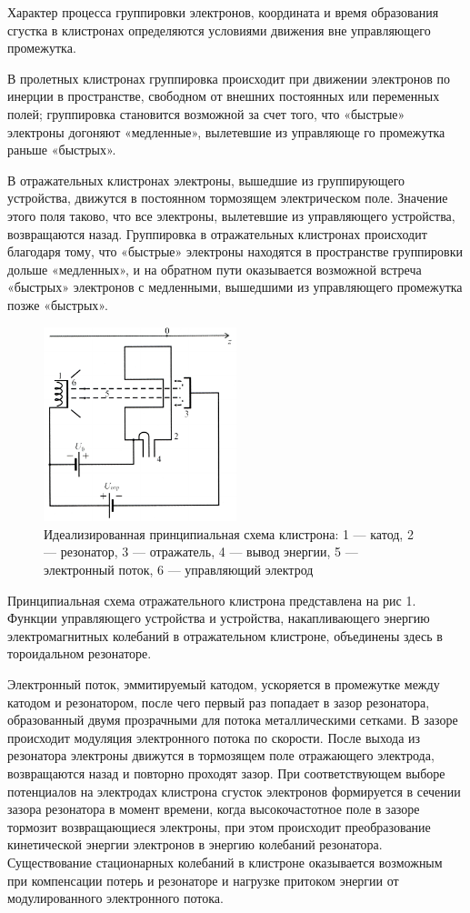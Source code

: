 Характер процесса группировки электронов, координата и время образо­вания сгустка в клистронах определяются условиями движения вне управ­ляющего промежутка.

В пролетных клистронах группировка происходит при движении элек­тронов по инерции в пространстве, свободном от внешних постоянных или
переменных полей; группировка становится возможной за счет того, что
«быстрые» электроны догоняют «медленные», вылетевшие из управляюще­
го промежутка раньше «быстрых».

В отражательных клистронах электроны, вышедшие из группирующего
устройства, движутся в постоянном тормозящем электрическом поле. Зна­чение этого поля таково, что все электроны, вылетевшие из управляющего
устройства, возвращаются назад. Группировка в отражательных клистро­нах происходит благодаря тому, что «быстрые» электроны находятся в про­странстве группировки дольше «медленных», и на обратном пути оказыва­ется возможной встреча «быстрых» электронов с медленными, вышедшими
из управляющего промежутка позже «быстрых».

\begin{figure}[h!]
	\centering
	\includegraphics[width=0.5\textwidth]{fig/fig1}
	\caption{Идеализированная принципиальная схема клистрона: 1 — катод, 2 — резонатор, 3 — отражатель, 4 — вывод энергии, 5 — электронный поток, 6 — управляющий электрод}
	\label{fig:1}
\end{figure}

Принципиальная схема отражательного клистрона представлена на рис 1.
Функции управляющего устройства и устройства, накапливающего энер­гию электромагнитных колебаний в отражательном клистроне, объединены
здесь в тороидальном резонаторе.

Электронный поток, эммитируемый катодом, ускоряется в промежутке
между катодом и резонатором, после чего первый раз попадает в зазор
резонатора, образованный двумя прозрачными для потока металлическими сетками. В зазоре происходит модуляция электронного потока по скоро­сти. После выхода из резонатора электроны движутся в тормозящем поле
отражающего электрода, возвращаются назад и повторно проходят зазор.
При соответствующем выборе потенциалов на электродах клистрона сгусток
электронов формируется в сечении зазора резонатора в момент времени, когда
высокочастотное поле в зазоре тормозит возвращающиеся электроны,
при этом происходит преобразование кинетической энергии электронов в
энергию колебаний резонатора. Существование стационарных колебаний в
клистроне оказывается возможным при компенсации потерь и резонаторе и
нагрузке притоком энергии от модулированного электронного потока.

